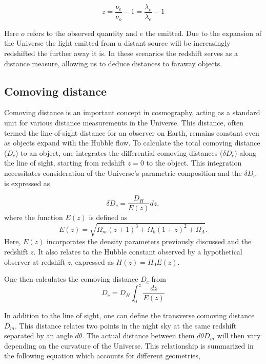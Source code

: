 \begin{equation}
    z = \frac{\nu_e}{\nu_o}-1 = \frac{\lambda_o}{\lambda_e}-1
\end{equation}

Here $o$ refers to the observed quantity and $e$ the emitted. Due to the expansion of the Universe the light emitted from a distant source will be increasingly redshifted the further away it is.
In these scenarios the redshift serves as a distance measure, allowing us to deduce distances to faraway objects.



\subsection{Comoving distance}
\label{sec:comoving_distance}


Comoving distance is an important concept in cosmography, 
acting as a standard unit for various distance measurements in the Universe. 
This distance, often termed the line-of-sight distance for an observer on Earth, 
remains constant even as objects expand with the Hubble flow. 
To calculate the total comoving distance ($D_c$) to an object, 
one integrates the differential comoving distances ($\delta D_c$) along the line of sight, starting from redshift 
$z=0$ to the object. This integration necessitates consideration of the Universe's parametric composition and the $\delta D_c$ is expressed as

\begin{equation}
    \delta D_c = \frac{D_H}{E(z)}dz,
\end{equation}
where the function $E(z)$ is defined as
\begin{equation}
    E(z)  = \sqrt{\Omega_m(z+1)^3 +\Omega_k (1+z)^2 + \Omega_\Lambda  }.
\end{equation}
Here, 
$E(z)$ incorporates the density parameters previously discussed and the redshift 
$z$. It also relates to the Hubble constant observed by a hypothetical observer at redshift $z$, expressed as 
$H(z) = H_0 E(z)$.

One then calculates the comoving distance $D_c$ from 
\begin{equation}
    D_c =D_H \int_0^z\frac{dz}{E(z)}
\end{equation}

In addition to the line of sight, one can define the transverse comoving distance $D_m$. This distance 
relates two points in the night sky at the same redshift separated by an angle $d\theta$. The actual distance
between them $d\theta D_m$ will then vary depending on the curvature of the Universe. This relationship is summarized in the following equation
which accounts for different geometries,

